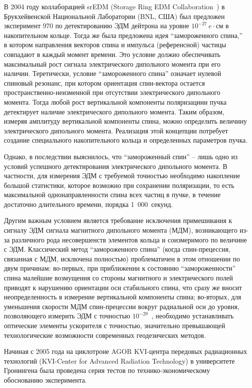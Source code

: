 В 2004 году коллаборацией srEDM (Storage Ring EDM Collaboration~\cite{BNL:SREDM}) 
в Брукхейвенской Национальной Лаборатории (BNL, США) был предложен эксперимент 970 
по детектированию ЭДМ дейтрона на уровне $10^{-27}~e\cdot$см в накопительном кольце. 
Тогда же была предложена идея ``замороженного спина,''~\cite{Farley:SREDM:Muon} 
в котором направления векторов спина и импульса (референсной) частицы совпадают в каждый момент времени. Это условие должно обеспечивать максимальный рост сигнала электрического дипольного момента при его наличии. Теретически, условие ``замороженного спина'' означает нулевой спиновый резонанс, при котором ориентация спин-вектора остается  пространственно-неизменной при отсутствии электрического дипольного момента. 
Тогда любой рост вертикальной компоненты поляризациии пучка детектирует наличие электрического дипольного момента. Таким образом, измеряя  амплитуду вертикальной компоненты спина, можно определить величину электрического дипольного момента. Реализация этой концепции потребует создание специального накопительного кольца и определенных параметров пучка.

Однако, в последствии выяснилось, что ``замороженный спин'' -- лишь одно из условий успешного детектирования электрического дипольного момента. В частности, для измерения ЭДМ с требуемой точностью необходимо накопление большой статистики, которое возможно при сохранении поляризации, то есть максимальной однонаправленности спина всех частиц в пучке, в течение достаточно длительного времени, порядка 1~000~секунд. 

Другим важным условием является требование исключения примешивания к сигналу ЭДМ 
сигнала магнитного дипольного момента (МДМ), возникающего из-за различного рода несовершенств 
элементов кольца и соизмеримого по величине с ЭДМ. 
Классический метод ``замороженного спина'' (когда спин-прецессия, связанная с МДМ, исключена полностью) проблематичен в этом отношении по двум причинам: 
во-первых, при приближении к состоянию ``замороженности'' спина малейшие возмущения со стороны магнитного и электрического полей приводят к нарушению ориентации оси стабильного спина, что сразу же вносит неопределенность в измерение вертикальной компоненты спина; 
во-вторых, для уменьшения скорости МДМ спин-прецессии вокруг радиальной оси до уровня, позволяющего измерить ЭДМ с точностью $10^{-29}$~\ecm, необходимо устанавливать оптические элементы ускорителя с точностью, значительно превышающей технологические возможности современных геодезических методов.

Начиная с 2005 года на циклотроне AGOR KVI-центра передовых радиационных технологий 
(KVI-Center for Advanced Radiation Technology) в университете Гронингена была проведена серия тестов 
по технико-экономическому обоснованию эксперимента.

